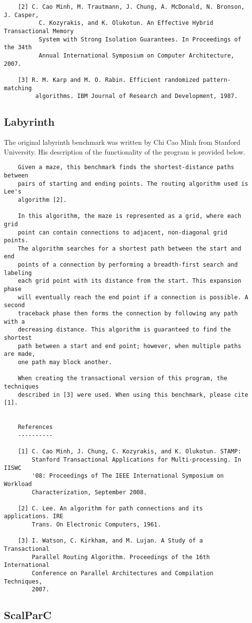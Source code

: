 \documentclass{article}
\begin{document}
\begin{verbatim}
    [2] C. Cao Minh, M. Trautmann, J. Chung, A. McDonald, N. Bronson, J. Casper,
          C. Kozyrakis, and K. Olukotun. An Effective Hybrid Transactional Memory
          System with Strong Isolation Guarantees. In Proceedings of the 34th 
          Annual International Symposium on Computer Architecture, 2007.

    [3] R. M. Karp and M. O. Rabin. Efficient randomized pattern-matching
         algorithms. IBM Journal of Research and Development, 1987.

\end{verbatim}

\subsection{Labyrinth}

The original labyrinth benchmark was written by Chi Cao Minh from Stanford 
University. His description of the functionality of the program is provided 
below.

\begin{verbatim}
    Given a maze, this benchmark finds the shortest-distance paths between
    pairs of starting and ending points. The routing algorithm used is Lee's 
    algorithm [2].
 
    In this algorithm, the maze is represented as a grid, where each grid 
    point can contain connections to adjacent, non-diagonal grid points. 
    The algorithm searches for a shortest path between the start and end 
    points of a connection by performing a breadth-first search and labeling 
    each grid point with its distance from the start. This expansion phase 
    will eventually reach the end point if a connection is possible. A second 
    traceback phase then forms the connection by following any path with a 
    decreasing distance. This algorithm is guaranteed to find the shortest 
    path between a start and end point; however, when multiple paths are made, 
    one path may block another.

    When creating the transactional version of this program, the techniques
    described in [3] were used. When using this benchmark, please cite [1].


    References
    ----------

    [1] C. Cao Minh, J. Chung, C. Kozyrakis, and K. Olukotun. STAMP: 
        Stanford Transactional Applications for Multi-processing. In IISWC
        '08: Proceedings of The IEEE International Symposium on Workload 
        Characterization, September 2008. 

    [2] C. Lee. An algorithm for path connections and its applications. IRE 
        Trans. On Electronic Computers, 1961.

    [3] I. Watson, C. Kirkham, and M. Lujan. A Study of a Transactional 
        Parallel Routing Algorithm. Proceedings of the 16th International 
        Conference on Parallel Architectures and Compilation Techniques, 
        2007.
\end{verbatim}

\subsection{ScalParC}


\end{document}
